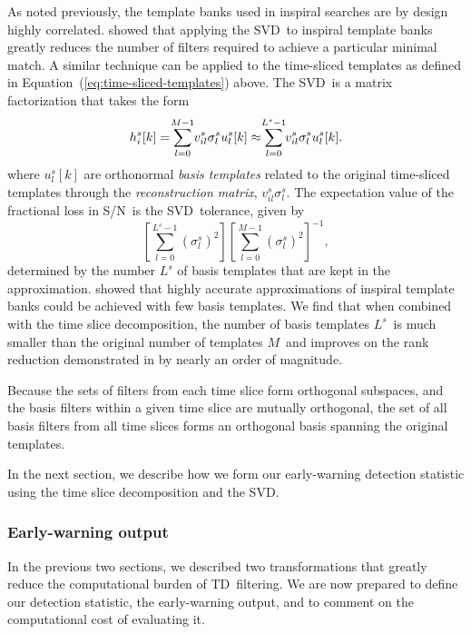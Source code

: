 \documentclass[preprint2]{aastex}
\newcommand{\SNR}{S/N}%
\newcommand{\numtmps}{\ensuremath{M}}
\newcommand{\SVD}{SVD}%
\newcommand{\svdtmps}[1]{\ensuremath{L^#1}}
\newcommand{\numsvdtmps}{\svdtmps{s}}
\newcommand{\TD}{TD}%
\def\clap#1{\hbox to 0pt{\hss#1\hss}}
\def\mathclap{\mathpalette\mathclapinternal}
\def\mathclapinternal#1#2{\clap{$\mathsurround=0pt#1{#2}$}}
\begin{document}
As noted previously, the template banks used in inspiral searches are by design
highly correlated.  \citet{Cannon:2010p10398} showed that applying the \SVD\
to inspiral template banks greatly reduces the number of filters required to achieve a
particular minimal match.  A similar technique can be applied to the time-sliced
templates as defined in Equation~(\ref{eq:time-sliced-templates}) above.  The \SVD\
is a matrix factorization that takes the form
%
\begin{equation}
h_i^s[k] = \sum_{\mathclap{l=0}}^{\mathclap{M-1}} v_{il}^s \sigma_l^s u_l^s[k] \approx \sum_{\mathclap{l=0}}^{\mathclap{L^s-1}} v_{il}^s \sigma_l^s u_l^s[k].
\label{eq:svddecomp}
\end{equation}
where $u_l^s[k]$ are orthonormal \emph{basis templates} related to the original
time-sliced templates through the \emph{reconstruction matrix}, $v_{il}^s\sigma_l^s$.
The expectation value of the fractional loss in \SNR\ is the \SVD\ tolerance, given by
%
\begin{equation*}
\left[ \sum_{l=0}^{L^s-1} \left( \sigma_l^s \right)^2 \right]\left[ \sum_{l=0}^{M-1} \left( \sigma_l^s \right)^2 \right]^{-1},
\end{equation*}
%
determined by the number $\numsvdtmps$ of basis templates that are kept in
the approximation.  \citet{Cannon:2010p10398}
showed that highly accurate approximations of inspiral template banks could be
achieved with few basis templates.  We find that when combined with the
time slice decomposition, the number of basis templates \numsvdtmps\ is much
smaller than the original number of templates \numtmps\ and improves on the
rank reduction demonstrated in \citet{Cannon:2010p10398} by nearly an order
of magnitude.

Because the sets of filters from each time slice form orthogonal subspaces, and
the basis filters within a given time slice are mutually orthogonal, the set of
all basis filters from all time slices forms an orthogonal basis spanning the
original templates.

In the next section, we describe how we form our early-warning detection
statistic using the time slice decomposition and the \SVD.

\subsubsection{Early-warning output}

In the previous two sections, we described two transformations that greatly
reduce the computational burden of \TD\ filtering.  We are now prepared to
define our detection statistic, the early-warning output, and to comment on the
computational cost of evaluating it.
\end{document}
